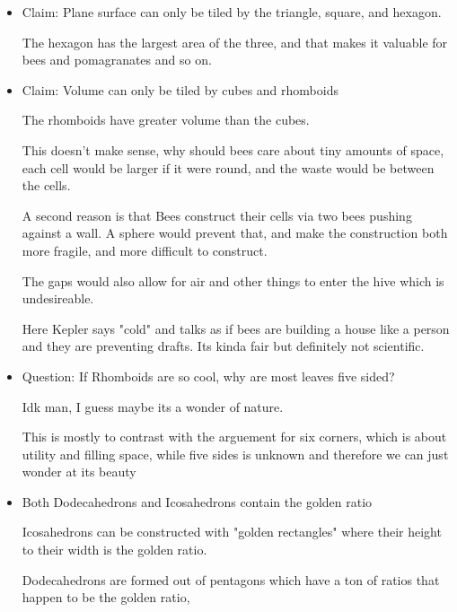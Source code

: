 \documentclass{report}
\begin{document}
\begin{itemize}
    \item Claim: Plane surface can only be tiled by
        the triangle, square, and hexagon.
        \begin{mdframed}
            The hexagon has the largest area of the
            three, and that makes it valuable for bees
            and pomagranates and so on.
        \end{mdframed}
    \item Claim: Volume can only be tiled by cubes
        and rhomboids
        \begin{mdframed}
            The rhomboids have greater volume than the cubes.

            This doesn't make sense, why should bees care about
            tiny amounts of space, each cell would be larger
            if it were round, and the waste would be between
            the cells.
        \end{mdframed}
        \begin{mdframed}
            A second reason is that Bees construct their
            cells via two bees pushing against a wall. A
            sphere would prevent that, and make the construction
            both more fragile, and more difficult to construct.

            The gaps would also allow for air and other things
            to enter the hive which is undesireable.

            \begin{mdframed}
                Here Kepler says "cold" and talks as if bees
                are building a house like a person and they
                are preventing drafts. Its kinda fair but
                definitely not scientific.
            \end{mdframed}
        \end{mdframed}
    \item Question: If Rhomboids are so cool, why are most
        leaves five sided?
        \begin{mdframed}
            Idk man, I guess maybe its a wonder of nature.

            \begin{mdframed}
                This is mostly to contrast with the arguement
                for six corners, which is about utility and
                filling space, while five sides is unknown
                and therefore we can just wonder at its beauty
            \end{mdframed}
        \end{mdframed}
    \item Both Dodecahedrons and Icosahedrons contain the golden
        ratio
        \begin{mdframed}
            Icosahedrons can be constructed with "golden rectangles"
            where their height to their width is the golden ratio.
        \end{mdframed}
        \begin{mdframed}
            Dodecahedrons are formed out of pentagons which have
            a ton of ratios that happen to be the golden ratio,


\end{mdframed}
\end{itemize}
\end{document}
